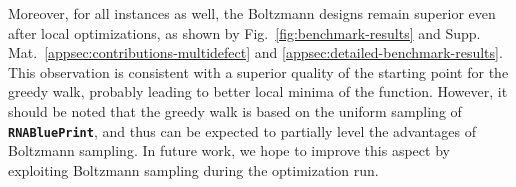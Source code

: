 \documentclass[]{bmcart}
\newcommand{\Obj}{\text{\rm MultiDefect}}
\newcommand{\RNAblueprint}{{\tt \bfseries{}\color{black!85} RNA\textcolor{blue!70!black}{Blue}Print}}
\newcommand{\ourprog}{{\tt \bfseries{}\color{black!85}RNA\textcolor{red!70!black}{Red}Print}}
\begin{document}
%
Moreover, for all instances as well, the Boltzmann designs
remain superior even after local optimizations, as shown by
Fig.~\ref{fig:benchmark-results} and Supp. Mat.~\ref{appsec:contributions-multidefect}
and \ref{appsec:detailed-benchmark-results}. This observation is consistent with a
superior quality of the starting point for the greedy walk, probably leading
to better local minima of the \Obj{} function. However, it should be noted
that the greedy walk is based on the uniform sampling of
\RNAblueprint{}, and thus can be expected to partially level the
advantages of Boltzmann sampling. In future work, we hope to improve
this aspect by exploiting Boltzmann sampling during the
optimization run.

%
%
\end{document}
